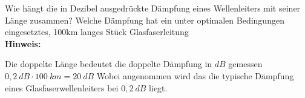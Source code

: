 \begin{question}[section=1,name={Strom und Spannungsverteilung},difficulty=,quantity=1,type=thr,tags={}]
	Wie hängt die in Dezibel ausgedrückte Dämpfung eines Wellenleiters mit seiner Länge zusammen? Welche Dämpfung hat ein unter optimalen Bedingungen eingesetztes, 100km langes Stück Glasfaserleitung
	\\ \textbf{Hinweis:}\\
	
\end{question}
\begin{solution}
	Die doppelte Länge bedeutet die doppelte Dämpfung in $dB$ gemessen \\
	$ 0,2~dB\cdot100~km=20~dB $
	Wobei angenommen wird das die typische Dämpfung eines Glasfaserwellenleiters bei  $ 0,2 ~dB$ liegt.
\end{solution}